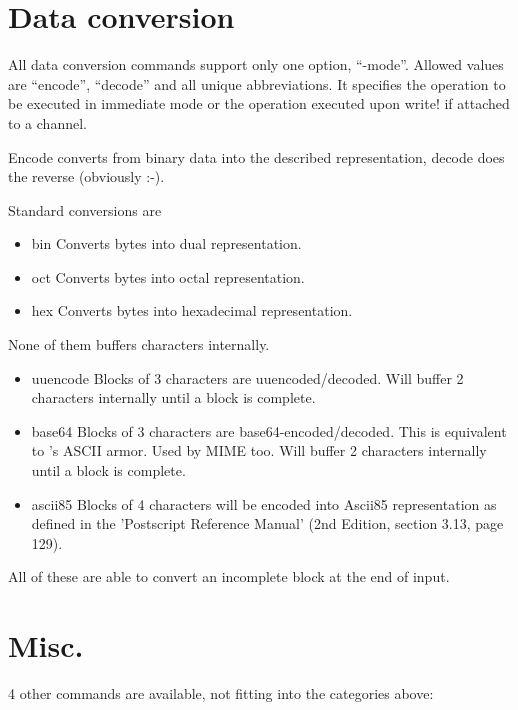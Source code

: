 \documentclass {report}
\begin{document}
\section {Data conversion}

All data conversion commands support only one option, ``-mode''.
Allowed values are ``encode'', ``decode'' and all unique
abbreviations. It specifies the operation to be executed in immediate
mode or the operation executed upon write! if attached to a channel.

Encode converts from binary data into the described representation,
decode does the reverse (obviously :-).

Standard conversions are
\begin {itemize}
\item[bin]	Converts bytes into dual representation.
\item[oct]	Converts bytes into octal representation.
\item[hex]	Converts bytes into hexadecimal representation.
\end   {itemize}
None of them buffers characters internally.

\begin {itemize}
\item[uuencode]	Blocks of 3 characters are uuencoded/decoded. Will
		buffer 2 characters internally until a block is complete.
\item[base64]	Blocks of 3 characters are
		base64-encoded/decoded. This is equivalent to \PGP{}'s
		ASCII armor. Used by MIME too. Will buffer 2
		characters internally until a block is complete.
\item[ascii85]	Blocks of 4 characters will be encoded into Ascii85
		representation as defined in the 'Postscript Reference
		Manual' (2nd Edition, section 3.13, page 129).
\end   {itemize}
All of these are able to convert an incomplete block at the end of
input.

\section {Misc.}

4 other commands are available, not fitting into the categories above:
\end{document}
